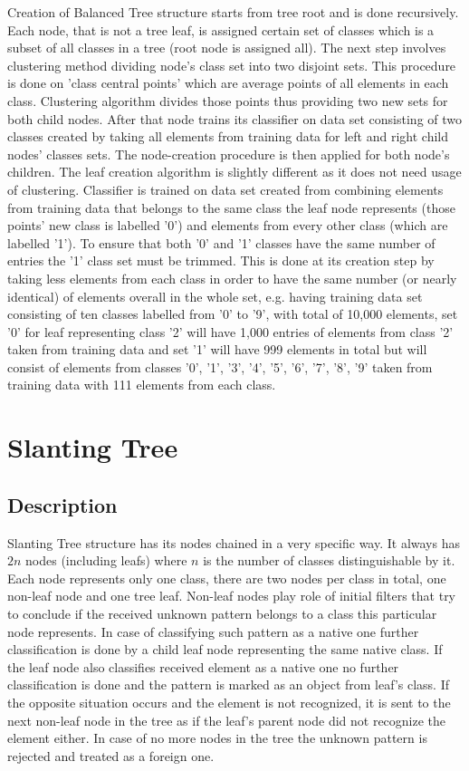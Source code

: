 Creation of Balanced Tree structure starts from tree root and is done recursively. Each node, that is not a tree leaf, is assigned certain set of classes which is a subset of all classes in a tree (root node is assigned all). The next step involves clustering method dividing node's class set into two disjoint sets. This procedure is done on 'class central points' which are average points of all elements in each class. Clustering algorithm divides those points thus providing two new sets for both child nodes. After that node trains its classifier on data set consisting of two classes created by taking all elements from training data for left and right child nodes' classes sets. The node-creation procedure is then applied for both node's children. The leaf creation algorithm is slightly different as it does not need usage of clustering. Classifier is trained on data set created from combining elements from training data that belongs to the same class the leaf node represents (those points' new class is labelled '0') and elements from every other class (which are labelled '1')\label{balanced_tree:one-vs-rest}. To ensure that both '0' and '1' classes have the same number of entries the '1' class set must be trimmed. This is done at its creation step by taking less elements from each class in order to have the same number (or nearly identical) of elements overall in the whole set, e.g. having training data set consisting of ten classes labelled from '0' to '9', with total of 10,000 elements, set '0' for leaf representing class '2' will have 1,000 entries of elements from class '2' taken from training data and set '1' will have 999 elements in total but will consist of elements from classes '0', '1', '3', '4', '5', '6', '7', '8', '9' taken from training data with 111 elements from each class.

\section{Slanting Tree}

\subsection{Description}

Slanting Tree structure has its nodes chained in a very specific way. It always has $ 2n $ nodes (including leafs) where $n$ is the number of classes distinguishable by it. Each node represents only one class, there are two nodes per class in total, one non-leaf node and one tree leaf. Non-leaf nodes play role of initial filters that try to conclude if the received unknown pattern belongs to a class this particular node represents. In case of classifying such pattern as a native one further classification is done by a child leaf node representing the same native class. If the leaf node also classifies received element as a native one no further classification is done and the pattern is marked as an object from leaf's class. If the opposite situation occurs and the element is not recognized, it is sent to the next non-leaf node in the tree as if the leaf's parent node did not recognize the element either. In case of no more nodes in the tree the unknown pattern is rejected and treated as a foreign one.

